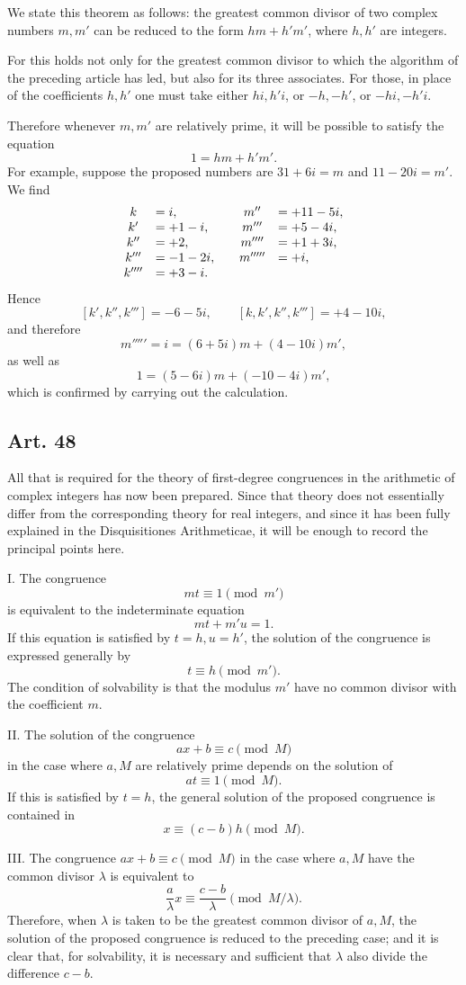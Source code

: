 \documentclass[12pt]{article}
\newcommand{\art}[1]{\subsection*{Art. #1}}
\begin{document}
We state this theorem as follows: the greatest common divisor of two complex numbers $m,m'$ can be reduced to the form $hm+h'm'$, where $h,h'$ are integers.

For this holds not only for the greatest common divisor to which the algorithm of the preceding article has led, but also for its three associates. For those, in place of the coefficients $h,h'$ one must take either $hi,h'i$, or $-h,-h'$, or $-hi,-h'i$.

Therefore whenever $m,m'$ are relatively prime, it will be possible to satisfy the equation
\[
1=hm+h'm'.
\]
For example, suppose the proposed numbers are $31+6i=m$ and $11-20i=m'$. We find
\[
\begin{array}{cl@{\qquad}cl}
k&=i,& m''&=+11-5i,\\
k'&=+1-i,& m'''&=+5-4i,\\
k''&=+2,& m''''&=+1+3i,\\
k'''&=-1-2i,& m'''''&=+i,\\
k''''&=+3-i.&&
\end{array}
\]
Hence
\[
[k',k'',k''']=-6-5i,
\qquad
[k,k',k'',k''']=+4-10i,
\]
and therefore
\[
m'''''=i=(6+5i)m+(4-10i)m',
\]
as well as
\[
1=(5-6i)m+(-10-4i)m',
\]
which is confirmed by carrying out the calculation.

\art{48}
All that is required for the theory of first-degree congruences in the arithmetic of complex integers has now been prepared. Since that theory does not essentially differ from the corresponding theory for real integers, and since it has been fully explained in the Disquisitiones Arithmeticae, it will be enough to record the principal points here.

I. The congruence
\[
mt\equiv 1 \pmod {m'}
\]
is equivalent to the indeterminate equation
\[
mt+m'u=1.
\]
If this equation is satisfied by $t=h,u=h'$, the solution of the congruence is expressed generally by
\[
t\equiv h\pmod {m'}.
\]
The condition of solvability is that the modulus $m'$ have no common divisor with the coefficient $m$.

II. The solution of the congruence
\[
ax+b\equiv c\pmod M
\]
in the case where $a,M$ are relatively prime depends on the solution of
\[
at\equiv1\pmod M.
\]
If this is satisfied by $t=h$, the general solution of the proposed congruence is contained in
\[
x\equiv(c-b)h\pmod M.
\]

III. The congruence $ax+b\equiv c\pmod M$ in the case where $a,M$ have the common divisor $\lambda$ is equivalent to
\[
\frac a\lambda x\equiv \frac{c-b}{\lambda}\pmod{M/\lambda}.
\]
Therefore, when $\lambda$ is taken to be the greatest common divisor of $a,M$, the solution of the proposed congruence is reduced to the preceding case; and it is clear that, for solvability, it is necessary and sufficient that $\lambda$ also divide the difference $c-b$.
\end{document}
